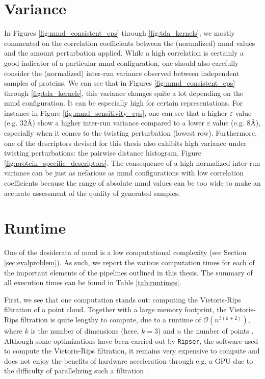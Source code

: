 \section{Variance}

In Figures \ref{fig:mmd_consistent_eps} through \ref{fig:tda_kernels}, we mostly
commented on the correlation coefficients between the (normalized) \acrshort{mmd} values
and the amount perturbation applied. While a high correlation is certainly a
good indicator of a particular \acrshort{mmd} configuration, one should also carefully
consider the (normalized) inter-run variance observed between independent
samples of proteins. We can see that in Figures \ref{fig:mmd_consistent_eps}
through \ref{fig:tda_kernels}, this variance changes quite a lot depending on
the \acrshort{mmd} configuration. It can be especially high for certain representations.
For instance in Figure \ref{fig:mmd_sensitivity_eps}, one can see that a higher
$\varepsilon$ value (e.g. 32\si{\angstrom}) show a higher inter-run variance
compared to a lower $\varepsilon$ value (e.g. 8\si{\angstrom}), especially when
it comes to the twisting perturbation (lowest row). Furthermore, one of the
descriptors devised for this thesis also exhibits high variance under twisting
perturbations: the pairwise distance histogram, Figure
\ref{fig:protein_specific_descriptors}. The consequence of a high normalized
inter-run variance can be just as nefarious as \acrshort{mmd} configurations with low
correlation coefficients because the range of absolute \acrshort{mmd} values can be too wide
to make an accurate assessment of the quality of generated samples.


\section{Runtime}\label{sec:results_runtime}

One of the desiderata of \acrshort{mmd} is a low computational complexity (see Section
\ref{sec:evalproblem}). As such, we report the various computation times for
each of the important elements of the pipelines outlined in this thesis. The
summary of all execution times can be found in Table \ref{tab:runtimes}.

First, we see that one computation stands out: computing the Vietoris-Rips
filtration of a point cloud. Together with a large memory footprint, the
Vietoris-Rips filtration is quite lengthy to compute, due to a runtime of
$\mathcal{O}(n^{3(k+2)})$, where $k$ is the number of dimensions (here, $k=3$)
and $n$ the number of points \citep{adams2018persistent}. Although some optimizations have been carried out
by \texttt{Ripser}, the software used to compute the Vietoris-Rips filtration,
it remains very expensive to compute and does not enjoy the benefits of hardware
acceleration through e.g. a GPU due to the difficulty of parallelizing such a
filtration \citep{Bauer2021Ripser}.

